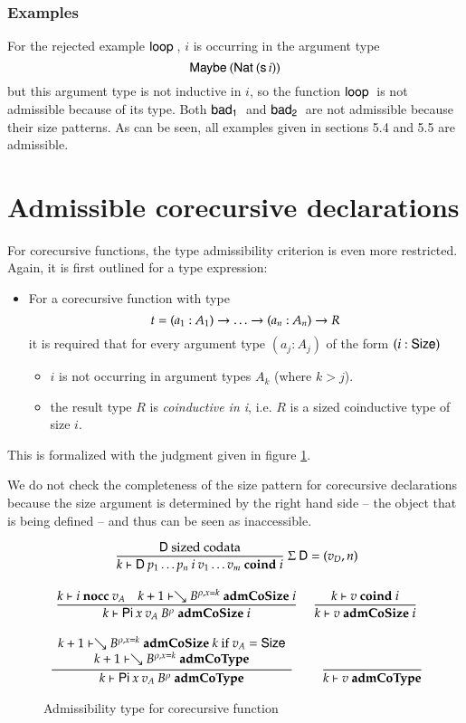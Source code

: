 \subsubsection{Examples}

For the rejected example $\mathsf{loop}\:$, $i$ is occurring in the argument type \[\mathsf{Maybe}\: (\mathsf{Nat}\: (\mathsf{s}\, i))\] but this argument type is not inductive in $i$, so the function $\mathsf{loop}\:$ is not admissible because of its type.
Both $\mathsf{bad_1}\:$ and $\mathsf{bad_2}\:$ are not admissible because their size patterns. 
As can be seen, all examples given in sections 5.4 and 5.5 are admissible.

\section{Admissible corecursive declarations}

For corecursive functions, the type admissibility criterion is even more restricted.
Again, it is first outlined for a type expression:
\begin{itemize}
\item
For a corecursive function with type \[t = (a_1 : A_1) \rightarrow \ldots \rightarrow (a_n : A_n) \rightarrow R\] it is required that 
for every argument type $(a_j : A_j)$ of the form $(i : \mathsf{Size})$  
\begin{itemize}
\item
$i$ is not occurring in argument types $A_k$ (where $k > j$). 
\item
the result type $R$ is \emph{coinductive in i}, i.e. $R$ is a sized coinductive type of size $i$. 
\end{itemize}
\end{itemize}
This is formalized with the judgment given in figure \ref{coadm}.

We do not check the completeness of the size pattern for corecursive declarations because the size argument is determined by the right hand side -- the object that is being defined -- and thus can be seen as inaccessible. 


\begin{figure}[htp]
\begin{gather*}
\ \dfrac{\mathsf{D} \mbox{ sized codata}}{k\vdash\mathsf{D} \: p_1 \ldots p_n \: i \: v_1 \ldots v_m\mbox{ \textbf{coind} }i}
{\: \Sigma \: \mathsf{D} = (v_D,n)}
\\[2ex]
\ \dfrac{k\vdash i\mbox{ \textbf{nocc} }v_A
\quad
k+1\vdash\searrow B^{\rho,x=k}\mbox{ \textbf{admCoSize} }i}{k\vdash\mathsf{Pi} \: x \: v_A \: B^{\rho}\mbox{ \textbf{admCoSize} }i}
\quad
\ \dfrac{k\vdash v\mbox{ \textbf{coind} }i}{k\vdash v\mbox{ \textbf{admCoSize} }i}
\\[2ex]
\ \dfrac{\begin{array}[b]{c}k+1\vdash\searrow B^{\rho,x=k}\mbox{ \textbf{admCoSize} }k \mbox{ if } v_A = \mathsf{Size}\\k+1\vdash\searrow B^{\rho,x=k}\mbox{ \textbf{admCoType}}\end{array}}{k\vdash\mathsf{Pi} \: x \: v_A \: B^{\rho}\mbox{ \textbf{admCoType}}}
\qquad
\ \dfrac{}{k\vdash v\mbox{ \textbf{admCoType}}}
\end{gather*}
\caption{Admissibility type for corecursive function}
\label{coadm}
\end{figure}


